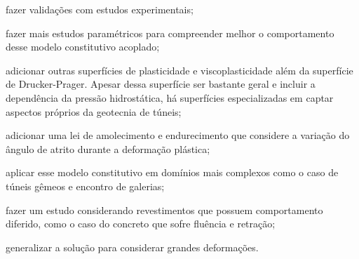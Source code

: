 \begin{alineas}
	
	\item fazer validações com estudos experimentais;
	
	\item fazer mais estudos paramétricos para compreender melhor o comportamento desse modelo constitutivo acoplado;
	
	\item adicionar outras superfícies de plasticidade e viscoplasticidade além da superfície de Drucker-Prager. Apesar dessa superfície ser bastante geral e incluir a dependência da pressão hidrostática, há superfícies especializadas em captar aspectos próprios da geotecnia de túneis;
	
	\item adicionar uma lei de amolecimento e endurecimento que considere a variação do ângulo de atrito durante a deformação plástica;
	
	\item aplicar esse modelo constitutivo em domínios mais complexos como o caso de túneis gêmeos e encontro de galerias;
	
	\item fazer um estudo considerando revestimentos que possuem comportamento diferido, como o caso do concreto que sofre fluência e retração;
	
	\item generalizar a solução para considerar grandes deformações.	
	
\end{alineas}